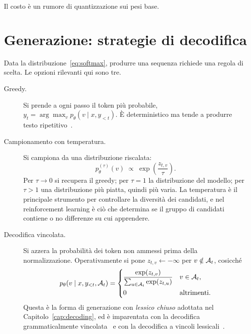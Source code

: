 Il costo è un rumore di quantizzazione sui pesi base.

\section{Generazione: strategie di decodifica}

Data la distribuzione~\eqref{eq:softmax}, produrre una sequenza richiede una
regola di scelta. Le opzioni rilevanti qui sono tre.

\begin{description}
  \item[Greedy.] Si prende a ogni passo il token più probabile,
        $y_t = \arg\max_v p_\theta(v \mid x, y_{<t})$. È deterministico ma tende
        a produrre testo ripetitivo~\cite{holtzman2019,welleck2020unlikelihood}.
  \item[Campionamento con temperatura.] Si campiona da una distribuzione
        riscalata:
        \begin{equation}
          \label{eq:temperature}
          p^{(\tau)}_\theta(v) \;\propto\; \exp\!\left(\frac{z_{t,v}}{\tau}\right).
        \end{equation}
        Per $\tau \to 0$ si recupera il greedy; per $\tau = 1$ la distribuzione
        del modello; per $\tau > 1$ una distribuzione più piatta, quindi più
        varia. La temperatura è il principale strumento per controllare la
        diversità dei candidati, e nel reinforcement learning è ciò che
        determina se il gruppo di candidati contiene o no differenze su cui
        apprendere.
  \item[Decodifica vincolata.] Si azzera la probabilità dei token non ammessi
        prima della normalizzazione. Operativamente si pone
        $z_{t,v} \leftarrow -\infty$ per $v \notin \mathcal{A}_t$, cosicché
        \begin{equation}
          \label{eq:constrained}
          p_\theta(v \mid x, y_{<t}, \mathcal{A}_t)
          =
          \begin{cases}
            \dfrac{\exp(z_{t,v})}{\sum_{u \in \mathcal{A}_t}\exp(z_{t,u})}
              & v \in \mathcal{A}_t,\\[2ex]
            0 & \text{altrimenti.}
          \end{cases}
        \end{equation}
        Questa è la forma di generazione con \emph{lessico chiuso} adottata nel
        Capitolo~\ref{cap:decoding}, ed è imparentata con la decodifica
        grammaticalmente vincolata~\cite{geng2023gcd,park2024gad} e con la
        decodifica a vincoli lessicali~\cite{hokamp2017,post2018}.
\end{description}

